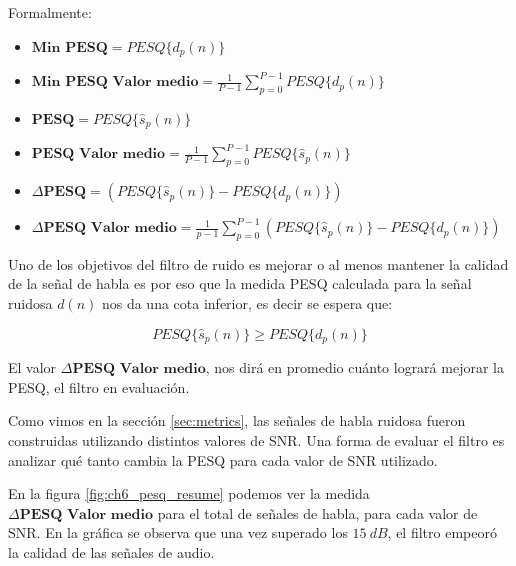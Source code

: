 Formalmente:

\begin{itemize}
	\item $\textbf{Min PESQ} = PESQ\{ d_p(n) \}$
	\item $\textbf{Min PESQ Valor medio} = \frac{1}{P-1} \sum_{p=0}^{P-1} PESQ\{ d_p(n) \}$
	\item $\textbf{PESQ} = PESQ\{ \hat{s}_p(n) \}$
	\item $\textbf{PESQ Valor medio} = \frac{1}{P-1} \sum_{p=0}^{P-1} PESQ\{ \hat{s}_p(n) \}$
	\item $\Delta \textbf{PESQ} = \left( PESQ\{ \hat{s}_p(n) \} - PESQ\{ d_p(n) \} \right)$
	\item $\Delta \textbf{PESQ Valor medio} = \frac{1}{p-1} \sum_{p=0}^{P-1} \left( PESQ\{ \hat{s}_p(n) \} - PESQ\{ d_p(n) \} \right)$
\end{itemize}

Uno de los objetivos del filtro de ruido es mejorar o al menos mantener la calidad de la señal de habla es por eso que la medida PESQ calculada para la señal ruidosa $d(n)$ nos da una cota inferior, es decir se espera que:

\begin{equation*}
	PESQ\{ \hat{s}_p(n) \} \geq PESQ\{ d_p(n) \}
\end{equation*}

El valor $\Delta \textbf{PESQ Valor medio}$, nos dirá en promedio cuánto logrará mejorar la PESQ, el filtro en evaluación.

Como vimos en la sección \ref{sec:metrics}, las señales de habla ruidosa fueron construidas utilizando distintos valores de SNR. Una forma de evaluar el filtro es analizar qué tanto cambia la PESQ para cada valor de SNR utilizado.

En la figura \ref{fig:ch6_pesq_resume} podemos ver la medida $\Delta \textbf{PESQ Valor medio}$ para el total de señales de habla, para cada valor de SNR. En la gráfica se observa que una vez superado los $\SI{15}{dB}$, el filtro empeoró la calidad de las señales de audio.

